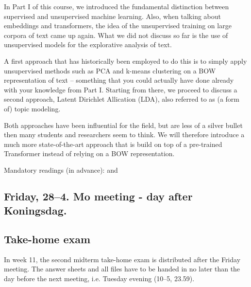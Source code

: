 In Part I of this course, we introduced the fundamental distinction between supervised and unsupervised machine learning. Also, when talking about embeddings and transformers, the idea of the unsupervised training on large corpora of text came up again. What we did not discuss so far is the use of unsupervised models for the explorative analysis of text.

A first approach that has historically been employed to do this is to simply apply unsupervised methods such as PCA and k-means clustering on a BOW representation of text -- something that you could actually have done already with your knowledge from Part I. Starting from there, we proceed to discuss a second approach, Latent Dirichlet Allication (LDA), also referred to as (a form of) topic modeling.

Both approaches have been influential for the field, but are less of a silver bullet then many students and researchers seem to think. We will therefore introduce a much more state-of-the-art approach that is build on top of a pre-trained Transformer instead of relying on a BOW representation.


Mandatory readings (in advance): \cite{Maier2018a} and  \cite{Grootendorst2022}

\subsection*{Friday, 28--4. Mo meeting - day after Koningsdag.}







\subsection*{Take-home exam}
In week 11, the second midterm take-home exam is distributed after the Friday meeting. The answer sheets and all files have to be handed in no later than the day before the next meeting, i.e. Tuesday evening (10--5, 23.59).





